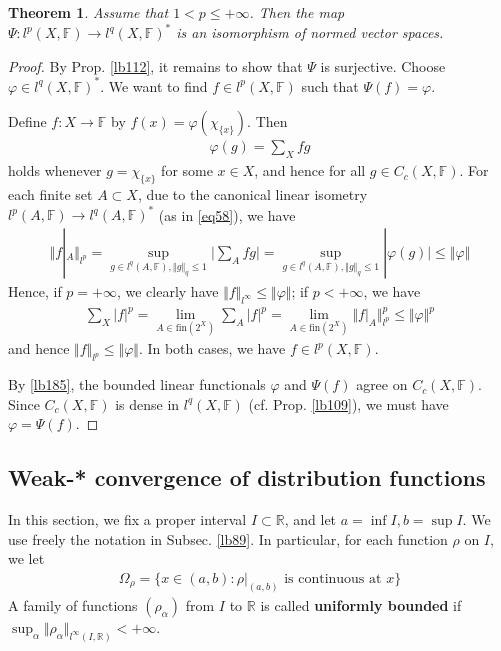 \documentclass[12pt,b5paper,notitlepage]{article}
\theoremstyle{definition}
\theoremstyle{plain}
\newtheorem{thm}[df]{Theorem}
\newcommand{\Rbb}{\mathbb R}
\newcommand{\fin}{\mathrm{fin}}
\newcommand{\Fbb}{\mathbb F}
\numberwithin{equation}{section}
\begin{document}
\begin{thm}\label{lb127}
Assume that $1<p\leq+\infty$. Then the map $\Psi:l^p(X,\Fbb)\rightarrow l^q(X,\Fbb)^*$ is an isomorphism of normed vector spaces.
\end{thm}



\begin{proof}
By Prop. \ref{lb112}, it remains to show that $\Psi$ is surjective. Choose $\varphi\in l^q(X,\Fbb)^*$. We want to find $f\in l^p(X,\Fbb)$ such that $\Psi(f)=\varphi$. 


Define $f:X\rightarrow\Fbb$ by $f(x)=\varphi(\chi_{\{x\}})$. Then
\begin{align}\label{eq185}
\varphi(g)=\sum_X fg
\end{align}
holds whenever $g=\chi_{\{x\}}$ for some $x\in X$, and hence for all $g\in C_c(X,\Fbb)$. For each finite set $A\subset X$, due to the canonical linear isometry $l^p(A,\Fbb)\rightarrow l^q(A,\Fbb)^*$ (as in \eqref{eq58}), we have
\begin{align*}
\Vert f|_A\Vert_{l^p}=\sup_{g\in l^q(A,\Fbb),\Vert g\Vert_q\leq 1}\Big|\sum_A fg  \Big|=\sup_{g\in l^q(A,\Fbb),\Vert g\Vert_q\leq 1}|\varphi(g)|\leq\Vert \varphi\Vert
\end{align*}
Hence, if $p=+\infty$, we clearly have $\Vert f\Vert_{l^\infty}\leq\Vert\varphi\Vert$; if $p<+\infty$, we have
\begin{align*}
\sum_X|f|^p=\lim_{A\in\fin(2^X)}\sum_A |f|^p=\lim_{A\in\fin(2^X)}\Vert f|_A\Vert_{l^p}^p\leq\Vert\varphi\Vert^p
\end{align*}
and hence $\Vert f\Vert_{l^p}\leq\Vert\varphi\Vert$. In both cases, we have $f\in l^p(X,\Fbb)$.

By \ref{lb185}, the bounded linear functionals $\varphi$ and $\Psi(f)$ agree on $C_c(X,\Fbb)$. Since $C_c(X,\Fbb)$ is dense in $l^q(X,\Fbb)$ (cf. Prop. \ref{lb109}), we must have $\varphi=\Psi(f)$.
\end{proof}







\subsection{Weak-* convergence of distribution functions}


In this section, we fix a proper interval $I\subset\Rbb$, and let $a=\inf I, b=\sup I$. We use freely the notation in Subsec. \ref{lb89}. In particular, for each function $\rho$ on $I$, we let
\begin{align*}
\Omega_\rho=\{x\in(a,b):\rho|_{(a,b)}\text{ is continuous at }x\}
\end{align*}
A family of functions $(\rho_\alpha)$ from $I$ to $\Rbb$ is called \textbf{uniformly bounded} if $\sup_\alpha \Vert\rho_\alpha\Vert_{l^\infty(I,\Rbb)}<+\infty$.
\end{document}
